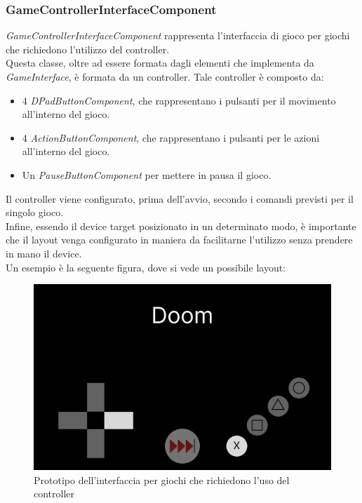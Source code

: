 \subsubsection{GameControllerInterfaceComponent}
\emph{GameControllerInterfaceComponent} rappresenta l'interfaccia di gioco per giochi che richiedono l'utilizzo del controller.\\
Questa classe, oltre ad essere formata dagli elementi che implementa da \emph{GameInterface}, è formata da un controller. Tale controller è composto da:
\begin{itemize}
    \item 4 \emph{DPadButtonComponent}, che rappresentano i pulsanti per il movimento all'interno del gioco.
    \item 4 \emph{ActionButtonComponent}, che rappresentano i pulsanti per le azioni\\ all'interno del gioco.
    \item Un \emph{PauseButtonComponent} per mettere in pausa il gioco.
\end{itemize}
Il controller viene configurato, prima dell'avvio, secondo i comandi previsti per il singolo gioco.\\
Infine, essendo il device target posizionato in un determinato modo, è importante che il layout venga configurato in maniera da facilitarne l'utilizzo senza prendere in mano il device.\\
Un esempio è la seguente figura, dove si vede un possibile layout:
\begin{figure}[h]
    \centering
    \includegraphics[width=340pt]{ProgettazioneTecnica/ControllerMockup.png}
    \caption{Prototipo dell'interfaccia per giochi che richiedono l'uso del controller}
    \label{fig:controller}
\end{figure}
